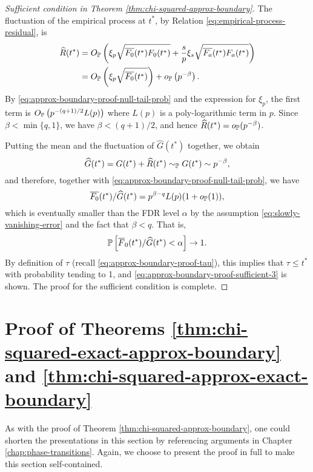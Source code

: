 \begin{proof}[Sufficient condition in Theorem \ref{thm:chi-squared-approx-boundary}]
The fluctuation of the empirical process at $t^*$, by Relation \eqref{eq:empirical-process-residual}, is 
\begin{align*}
    \widehat{R}(t^*) 
    &= O_\P\left(\xi_p\sqrt{\overline{F_0}(t^*)F_0(t^*)} + \frac{s}{p}\xi_s\sqrt{\overline{F_a}(t^*)F_a(t^*)}\right)\\
    &= O_\P\left(\xi_p\sqrt{\overline{F_0}(t^*)}\right) + o_\P\left(p^{-\beta}\right).
\end{align*}
By \eqref{eq:approx-boundary-proof-null-tail-prob} and the expression for $\xi_p$, the first term is $O_\P\left(p^{-(q+1)/2}L(p)\right)$ where $L(p)$ is a poly-logarithmic term in $p$.
Since $\beta<\min\{q,1\}$, we have $\beta<(q+1)/2$, and hence $\widehat{R}(t^*) = o_\P(p^{-\beta})$.

Putting the mean and the fluctuation of $\widehat{G}(t^*)$ together, we obtain
$$
\widehat{G}(t^*) = G(t^*) + \widehat{R}(t^*) \sim_\P G(t^*) \sim p^{-\beta},
$$
and therefore, together with \eqref{eq:approx-boundary-proof-null-tail-prob}, we have
$$
\overline{F_0}(t^*)/\widehat{G}(t^*) = p^{\beta-q}L(p)(1+o_{\P}(1)),
$$
which is eventually smaller than the FDR level $\alpha$ by the assumption \eqref{eq:slowly-vanishing-error} and the fact that $\beta<q$.
That is, 
$$
\P\left[\overline{F}_0(t^*) / \widehat{G}(t^*) < \alpha\right] \to 1.
$$
By definition of $\tau$ (recall \eqref{eq:approx-boundary-proof-tau}), this implies that $\tau \le t^*$ with probability tending to 1, and \eqref{eq:approx-boundary-proof-sufficient-3} is shown.
The proof for the sufficient condition is complete.
\end{proof}

\section{Proof of Theorems \ref{thm:chi-squared-exact-approx-boundary} and \ref{thm:chi-squared-approx-exact-boundary}}
\label{subsec:proof-chi-squared-mix-boundaries}

As with the proof of Theorem \ref{thm:chi-squared-approx-boundary}, one could shorten the presentations in this section by 
referencing arguments in Chapter \ref{chap:phase-transitions}.  Again, we choose to present the proof in full to make this section 
self-contained.

